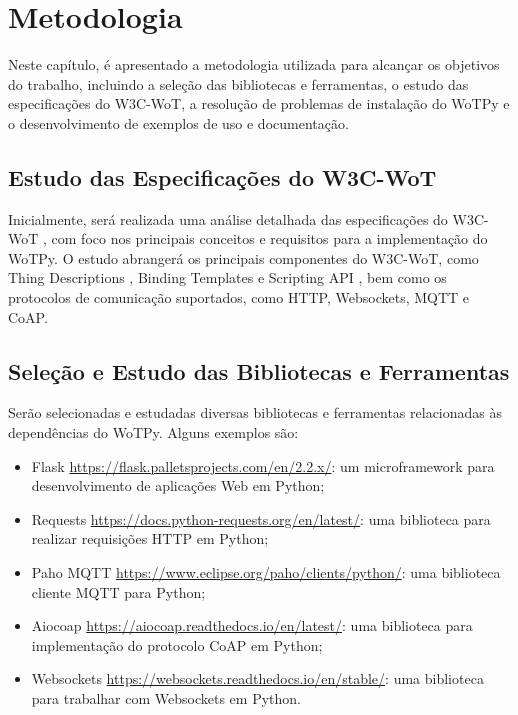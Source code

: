 \chapter{Metodologia}

Neste capítulo, é apresentado a metodologia utilizada para alcançar os objetivos do trabalho, incluindo a seleção das bibliotecas e ferramentas, o estudo das especificações do W3C-WoT, a resolução de problemas de instalação do WoTPy e o desenvolvimento de exemplos de uso e documentação.

\section{Estudo das Especificações do W3C-WoT} \label{estudo}

Inicialmente, será realizada uma análise detalhada das especificações do W3C-WoT \cite{WoTArchitecture}, com foco nos principais conceitos e requisitos para a implementação do WoTPy. O estudo abrangerá os principais componentes do W3C-WoT, como Thing Descriptions \cite{McCool:23:WTT}, Binding Templates \cite{WoTBinding} e Scripting API \cite{WoTScripting}, bem como os protocolos de comunicação suportados, como HTTP, Websockets, MQTT e CoAP.

\section{Seleção e Estudo das Bibliotecas e Ferramentas} \label{dependência}

Serão selecionadas e estudadas diversas bibliotecas e ferramentas relacionadas às dependências do WoTPy. Alguns exemplos são:

\begin{itemize}
    \item Flask \url{https://flask.palletsprojects.com/en/2.2.x/}: um microframework para desenvolvimento de aplicações Web em Python;
    \item Requests \url{https://docs.python-requests.org/en/latest/}: uma biblioteca para realizar requisições HTTP em Python;
    \item Paho MQTT \url{https://www.eclipse.org/paho/clients/python/}: uma biblioteca cliente MQTT para Python;
    \item Aiocoap \url{https://aiocoap.readthedocs.io/en/latest/}: uma biblioteca para implementação do protocolo CoAP em Python;
    \item Websockets \url{https://websockets.readthedocs.io/en/stable/}: uma biblioteca para trabalhar com Websockets em Python.
\end{itemize}

